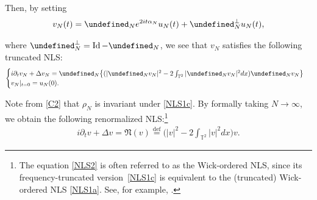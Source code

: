 \documentclass[%
11pt,  reqno]{amsart}
\DeclareMathOperator{\Id}{Id}
\newcommand{\1}{\hspace{0.2mm}\text{I}\hspace{0.2mm}}
\newcommand{\noi}{\noindent}
\newcommand{\T}{\mathbb{T}}
\let\P= \undefined
\newcommand{\P}{\mathbf{P}}
\newcommand{\Nf}{\mathfrak{N}}
\newcommand{\al}{\alpha}
\newcommand{\dt}{\partial_t}
\renewcommand{\o}{\omega}
\numberwithin{equation}{section}
\numberwithin{theorem}{section}
\DeclareMathOperator{\Law}{Law}
\begin{document}
\noi
Then, by setting
\begin{align}
v_N(t)  = \P_N e^{2 it \al_N} u_N(t) + \P_N^\perp u_N(t),
\label{C2} 
\end{align}

\noi
where $\P_N^\perp = \Id - \P_N$, 
we see  that 
$v_N$ satisfies 
the following truncated NLS:
\begin{align}
\begin{cases}
i \dt v_N +  \Delta v _N=  \P_N\big\{ ( |\P_N v_N|^{2}  - 2\int_{\T^2} |\P_N v_N|^2 dx )  \P_N v_N\big\}\\
v_N|_{t = 0} = u_N(0).
\end{cases}
%
\label{NLS1c}
\end{align}


\noi
Note from 
\eqref{C2} that  $\rho_N$
is invariant under \eqref{NLS1c}.
By formally taking $N \to \infty$, 
we obtain the following renormalized NLS:\footnote{The equation
\eqref{NLS2}
is often referred to as the Wick-ordered NLS, 
since
its frequency-truncated version~\eqref{NLS1c} is equivalent to the (truncated) Wick-ordered
NLS \eqref{NLS1a}.
See, for example, \cite{Christ, GH, GO, FOW, OW2, OW3}.}
\begin{align}
\label{NLS2}
\textstyle
i \partial_t v + \Delta v = 
\Nf(v)
\stackrel{\text{def}}{=} \big( |v|^2 - 2 \int_{\T^2}|v|^2 dx \big) v.
\end{align}
\end{document}
